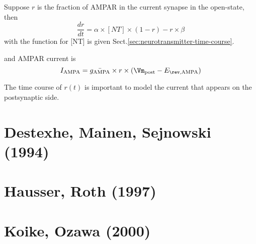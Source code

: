 Suppose $r$ is the fraction of AMPAR in the current synapse in the open-state,
then
\begin{equation}
\frac{dr}{dt} = \alpha \times [NT] \times (1-r) - r \times \beta
\end{equation}
with the function for [NT] is given Sect.\ref{sec:neurotransmitter-time-course}.

and AMPAR current is
\begin{equation}
I_\AMPA = \bar{g_\AMPA} \times r \times (\Vm_\post - E_{\rev,\AMPA})
\end{equation}

The time course of $r(t)$ is important to model the current that appears on the
postsynaptic side. 

\section{Destexhe, Mainen, Sejnowski (1994)}


\section{Hausser, Roth (1997)}


\section{Koike, Ozawa (2000)}

